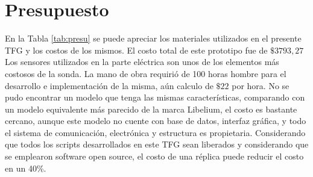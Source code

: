 \section[Presupuesto]{Presupuesto}
En la Tabla \ref{tab:presu} se puede apreciar los materiales utilizados en el presente TFG y los costos de los mismos. 
El costo total de este prototipo fue de $\$ 3793,27$
Los sensores utilizados en la parte eléctrica son unos de los elementos más costosos de la sonda.
La mano de obra requirió de 100 horas hombre para el desarrollo e implementación de la misma, aún calculo de $\$22$ por hora. No se pudo encontrar un modelo que tenga las mismas características, comparando con un modelo equivalente más parecido de la marca Libelium, el costo es bastante cercano, aunque este modelo no cuente con base de datos, interfaz gráfica, y todo el sistema de comunicación, electrónica y estructura es propietaria.
Considerando que todos los scripts desarrollados en este TFG sean liberados y considerando que se emplearon software open source, el costo de una réplica puede reducir el costo en un 40\%.
